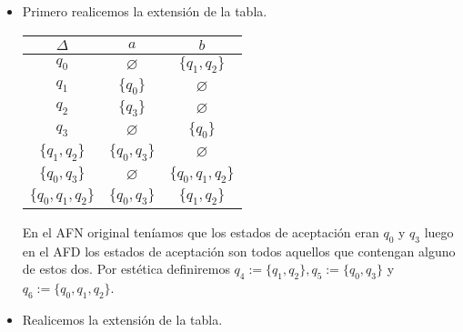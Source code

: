     \begin{itemize}[label={✎}]
        \item Primero realicemos la extensión de la tabla.
       
       \begin{center}
               \begin{tabular}{|c|c|c|}
        \hline
        $\Delta$ & $a$ & $b$\\
        \hline 
        $q_0$ & $\varnothing$ & $\{q_1,q_2\}$ \\ 
        \hline
        $q_1$ &$\{q_0\}$ &$\varnothing$ \\ 
        \hline
        $q_2$& $\{q_3\}$& $\varnothing$ \\ 
        \hline
        $q_3$&$\varnothing$&$\{q_0\}$\\ 
        \hline
    
        $\{q_1,q_2\}$&$\{q_0,q_3\}$&$\varnothing$\\ 
        \hline
        $\{q_0,q_3\}$&$\varnothing$&$\{q_0,q_1,q_2\}$\\
        \hline
        $\{q_0,q_1,q_2\}$&$\{q_0,q_3\}$&$\{q_1,q_2\}$\\ 
        \hline
        \end{tabular}
       \end{center}
       
        En el AFN original teníamos que los estados de aceptación eran $q_0$ y $q_3$ luego en el AFD los estados de aceptación son todos aquellos que contengan alguno de estos dos. Por  estética definiremos $q_4:=\{q_1,q_2\},q_5:=\{q_0,q_3\}$ y $q_6:=\{q_0,q_1,q_2\}$. 
        \begin{basedtikz}
        \end{basedtikz}

        \item Realicemos la extensión de la tabla.


\end{itemize}
